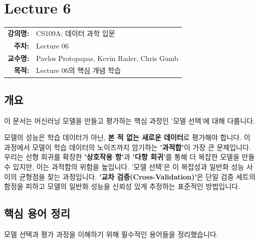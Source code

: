 \documentclass[11pt,a4paper]{book}
\makeatletter
\theoremstyle{definition}
\newcommand{\metainfo}[4]{
\begin{tcolorbox}[
    colback=lightpurple,
    colframe=darkpurple,
    boxrule=1pt,
    arc=2mm,
    left=10pt,
    right=10pt,
    top=8pt,
    bottom=8pt
]
\begin{tabular}{@{}rl@{}}
\textbf{강의명:} & #1 \\[0.3em]
\textbf{주차:} & #2 \\[0.3em]
\textbf{교수명:} & #3 \\[0.3em]
\textbf{목적:} & \begin{minipage}[t]{0.75\textwidth}#4\end{minipage}
\end{tabular}
\end{tcolorbox}
}
\makeatother
\begin{document}
\chapter{Lecture 6}
\label{ch:lecture6}

\metainfo{CS109A: 데이터 과학 입문}{Lecture 06}{Pavlos Protopapas, Kevin Rader, Chris Gumb}{Lecture 06의 핵심 개념 학습}


\section{개요}

이 문서는 머신러닝 모델을 만들고 평가하는 핵심 과정인 '모델 선택'에 대해 다룹니다.

모델의 성능은 학습 데이터가 아닌, \textbf{본 적 없는 새로운 데이터}로 평가해야 합니다.
이 과정에서 모델이 학습 데이터의 노이즈까지 암기하는 \textbf{'과적합'}이 가장 큰 문제입니다.
우리는 선형 회귀를 확장한 \textbf{'상호작용 항'}과 \textbf{'다항 회귀'}를 통해 더 복잡한 모델을 만들 수 있지만, 이는 과적합의 위험을 높입니다.
'모델 선택'은 이 복잡성과 일반화 성능 사이의 균형점을 찾는 과정입니다.
\textbf{'교차 검증(Cross-Validation)'}은 단일 검증 세트의 함정을 피하고 모델의 일반화 성능을 신뢰성 있게 추정하는 표준적인 방법입니다.


\section{핵심 용어 정리}

모델 선택과 평가 과정을 이해하기 위해 필수적인 용어들을 정리했습니다.
\end{document}
